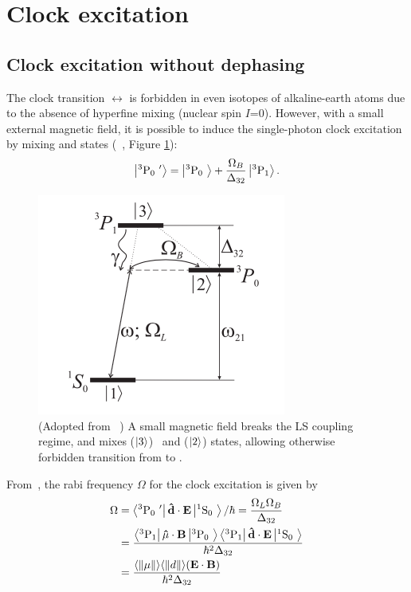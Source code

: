 \section{Clock excitation}
\label{sec:clock excitation}

\subsection{Clock excitation without dephasing}

	The clock transition \SSZ $\leftrightarrow$ \TPZ is forbidden in even isotopes of alkaline-earth atoms due to the absence of hyperfine mixing (nuclear spin $I$=0). However, with a small external magnetic field, it is possible to induce the single-photon clock excitation by mixing \TPZ and \SSZ states (~\cite{Taichenachev06}, Figure \ref{fig:energy_level}):
	\begin{align}
	\ket{{{^{3}}\mathrm{P}_{0}} \ '}=\ket{{{^{3}}\mathrm{P}_{0}} \ }+\frac{\Omega_{B}}{\Delta_{32}}\ket{{{^{3}}\mathrm{P}_{1}}}.
	\end{align}
	\begin{figure}[h]
	    \centering
	    \includegraphics[scale=0.8]{figures/clock/energy_level}
	    \caption{(Adopted from ~\cite{Taichenachev06}) A small magnetic field breaks the LS coupling regime, and mixes \TPO ($\ket{3}$) \ and \TPZ($\ket{2}$) states, allowing otherwise forbidden transition from \SSZ to \TPZ.}
	    \label{fig:energy_level}
	\end{figure}
	From~\cite{Taichenachev06}, the rabi frequency $\Omega$ for the  clock excitation is given by
	\begin{align}
	\Omega&=\bra{{{^{3}}\mathrm{P}_{0}} \ '}\mathbf{\hat{d}\cdot E}\ket{{{^{1}}\mathrm{S}_{0}} \ }/\hbar=\frac{\Omega_L\Omega_B}{\Delta_{32}}\\
	&=\frac{\bra{{{^{3}}\mathrm{P}_{1}}}\mathbf{\hat{\mu}\cdot B}\ket{{{^{3}}\mathrm{P}_{0}} \ }\bra{{{^{3}}\mathrm{P}_{1}}}\mathbf{\hat{d}\cdot E}\ket{{{^{1}}\mathrm{S}_{0}} \ }}{\hbar^{2}\Delta_{32}}\\
	&=\frac{\langle\norm{\mu}\rangle\langle\norm{d}\rangle(\mathbf{E\cdot B)}} {\hbar^{2}\Delta_{32}}
	\end{align}
